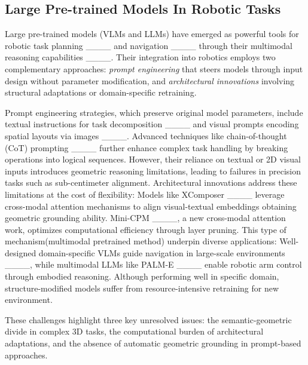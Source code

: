 \subsection{Large Pre-trained Models In Robotic Tasks}

Large pre-trained models (VLMs and LLMs) have emerged as powerful tools for robotic task planning ____ and navigation ____ through their multimodal reasoning capabilities ____. Their integration into robotics employs two complementary approaches: \textit{prompt engineering} that steers models through input design without parameter modification, and \textit{architectural innovations} involving structural adaptations or domain-specific retraining. 

Prompt engineering strategies, which preserve original model parameters, include textual instructions for task decomposition ____ and visual prompts encoding spatial layouts via images ____. Advanced techniques like chain-of-thought (CoT) prompting ____ further enhance complex task handling by breaking operations into logical sequences. However, their reliance on textual or 2D visual inputs introduces geometric reasoning limitations, leading to failures in precision tasks such as sub-centimeter alignment. 
Architectural innovations address these limitations at the cost of flexibility: Models like XComposer ____ leverage cross-modal attention mechanisms to align visual-textual embeddings obtaining geometric grounding ability. Mini-CPM ____, a new cross-modal attention work, optimizes computational efficiency through layer pruning. This type of mechanism(multimodal pretrained method) underpin diverse applications: Well-designed domain-specific VLMs guide navigation in large-scale environments ____, while multimodal LLMs like PALM-E ____ enable robotic arm control through embodied reasoning. Although performing well in specific domain, structure-modified models suffer from resource-intensive retraining for new environment. 

These challenges highlight three key unresolved issues: the semantic-geometric divide in complex 3D tasks, the computational burden of architectural adaptations, and the absence of automatic geometric grounding in prompt-based approaches.